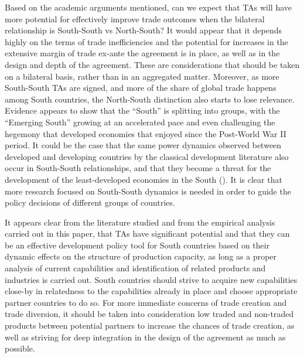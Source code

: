 Based on the academic arguments mentioned, can we expect that TAs will
have more potential for effectively improve trade outcomes when the
bilateral relationship is South-South vs North-South? It would appear
that it depends highly on the terms of trade inefficiencies and the
potential for increases in the extensive margin of trade ex-ante the
agreement is in place, as well as in the design and depth of the
agreement. These are considerations that should be taken on a bilateral
basis, rather than in an aggregated matter. Moreover, as more
South-South TAs are signed, and more of the share of global trade
happens among South countries, the North-South distinction also starts
to lose relevance. Evidence appears to show that the ``South'' is
splitting into groups, with the ``Emerging South'' growing at an
accelerated pace and even challenging the hegemony that developed
economies that enjoyed since the Post-World War II period. It could be
the case that the same power dynamics observed between developed and
developing countries by the classical development literature also occur
in South-South relationships, and that they become a threat for the
development of the least-developed economies in the South (\cite{dahi_south-south_2017}). It is clear that more research focused on South-South
dynamics is needed in order to guide the policy decisions of different
groups of countries.

It appears clear from the literature studied and from the empirical
analysis carried out in this paper, that TAs have significant potential
and that they can be an effective development policy tool for South
countries based on their dynamic effects on the structure of production
capacity, as long as a proper analysis of current capabilities and
identification of related products and industries is carried out. South
countries should strive to acquire new capabilities close-by in
relatedness to the capabilities already in place and choose appropriate
partner countries to do so. For more immediate concerns of trade
creation and trade diversion, it should be taken into consideration low
traded and non-traded products between potential partners to increase
the chances of trade creation, as well as striving for deep integration
in the design of the agreement as much as possible.

%
